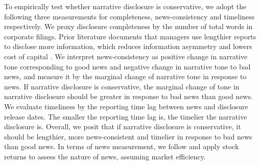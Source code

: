 \documentclass[a4paper]{article}
\begin{document}
\begin{spacing}{2}
To empirically test whether narrative disclosure is conservative, we adopt the following three measurements for completeness, news-consistency and timeliness respectively. We proxy disclosure completeness by the number of total words in corporate filings. Prior literature documents that managers use lengthier reports to disclose more information, which reduces information asymmetry and lowers cost of capital \citep*{leuzDisclosureCostCapital2009}. We interpret news-consistency as positive change in narrative tone corresponding to good news and negative change in narrative tone to bad news, and measure it by the marginal change of narrative tone in response to news. If narrative disclosure is conservative, the marginal change of tone in narrative disclosure should be greater in response to bad news than good news. We evaluate timeliness by the reporting time lag between news and disclosure release dates. The smaller the reporting time lag is, the timelier the narrative disclosure is. Overall, we posit that if narrative disclosure is conservative, it should be lengthier, more news-consistent and timelier in response to bad news than good news. In terms of news measurement, we follow \citet{basuConservatismPrincipleAsymmetric1997} and apply stock returns to assess the nature of news, assuming market efficiency.


\end{spacing}
\end{document}
